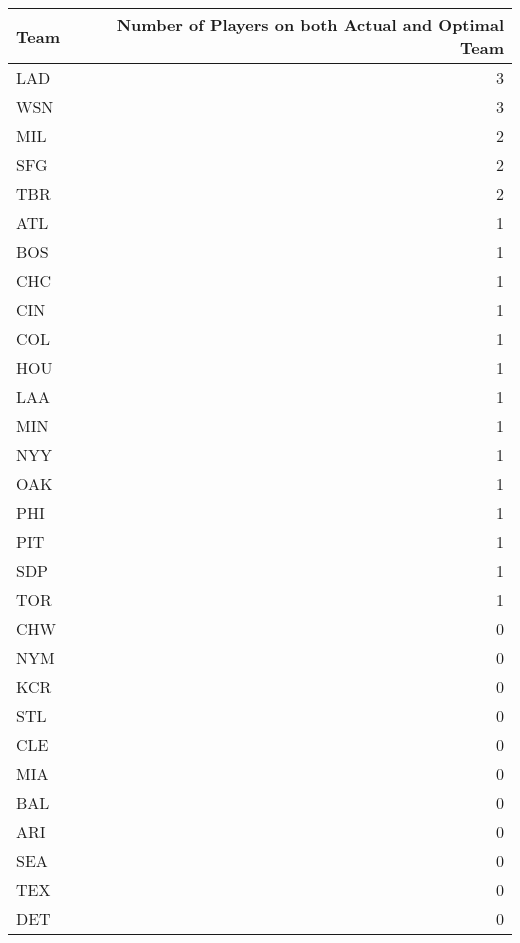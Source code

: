 \begin{table}
\centering
\begin{tabular}{l|r}
\hline
Team & Number of Players on both Actual and Optimal Team\\
\hline
LAD & 3\\
\hline
WSN & 3\\
\hline
MIL & 2\\
\hline
SFG & 2\\
\hline
TBR & 2\\
\hline
ATL & 1\\
\hline
BOS & 1\\
\hline
CHC & 1\\
\hline
CIN & 1\\
\hline
COL & 1\\
\hline
HOU & 1\\
\hline
LAA & 1\\
\hline
MIN & 1\\
\hline
NYY & 1\\
\hline
OAK & 1\\
\hline
PHI & 1\\
\hline
PIT & 1\\
\hline
SDP & 1\\
\hline
TOR & 1\\
\hline
CHW & 0\\
\hline
NYM & 0\\
\hline
KCR & 0\\
\hline
STL & 0\\
\hline
CLE & 0\\
\hline
MIA & 0\\
\hline
BAL & 0\\
\hline
ARI & 0\\
\hline
SEA & 0\\
\hline
TEX & 0\\
\hline
DET & 0\\
\hline
\end{tabular}
\end{table}
